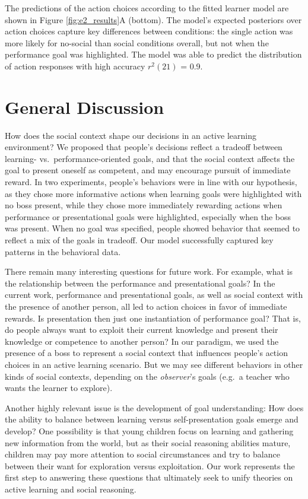 \documentclass[10pt, letterpaper]{article}
\begin{document}
The predictions of the action choices according to the fitted learner
model are shown in Figure \ref{fig:e2_results}A (bottom). The model's
expected posteriors over action choices capture key differences between
conditions: the single action was more likely for no-social than social
conditions overall, but not when the performance goal was highlighted.
The model was able to predict the distribution of action responses with
high accuracy \(r^2(21)\) = 0.9.

\section{General Discussion}\label{general-discussion}

How does the social context shape our decisions in an active learning
environment? We proposed that people's decisions reflect a tradeoff
between learning- vs.~performance-oriented goals, and that the social
context affects the goal to present oneself as competent, and may
encourage pursuit of immediate reward. In two experiments, people's
behaviors were in line with our hypothesis, as they chose more
informative actions when learning goals were highlighted with no boss
present, while they chose more immediately rewarding actions when
performance or presentational goals were highlighted, especially when
the boss was present. When no goal was specified, people showed behavior
that seemed to reflect a mix of the goals in tradeoff. Our model
successfully captured key patterns in the behavioral data.

There remain many interesting questions for future work. For example,
what is the relationship between the performance and presentational
goals? In the current work, performance and presentational goals, as
well as social context with the presence of another person, all led to
action choices in favor of immediate rewards. Is presentation then just
one instantiation of performance goal? That is, do people always want to
exploit their current knowledge and present their knowledge or
competence to another person? In our paradigm, we used the presence of a
boss to represent a social context that influences people's action
choices in an active learning scenario. But we may see different
behaviors in other kinds of social contexts, depending on the
\emph{observer}'s goals (e.g.~a teacher who wants the learner to
explore).

Another highly relevant issue is the development of goal understanding:
How does the ability to balance between learning versus
self-presentation goals emerge and develop? One possibility is that
young children focus on learning and gathering new information from the
world, but as their social reasoning abilities mature, children may pay
more attention to social circumstances and try to balance between their
want for exploration versus exploitation. Our work represents the first
step to answering these questions that ultimately seek to unify theories
on active learning and social reasoning.
\end{document}
